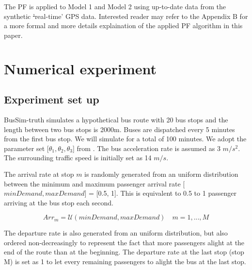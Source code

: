 \documentclass[11pt]{article}
\providecommand{\DIFaddtex}[1]{{\protect\color{blue}\uwave{#1}}} %
\providecommand{\DIFdeltex}[1]{{\protect\color{red}\sout{#1}}}                      %
\providecommand{\DIFaddbegin}{} %
\providecommand{\DIFaddend}{} %
\providecommand{\DIFdelbegin}{} %
\providecommand{\DIFdelend}{} %
\providecommand{\DIFadd}[1]{\texorpdfstring{\DIFaddtex{#1}}{#1}} %
\providecommand{\DIFdel}[1]{\texorpdfstring{\DIFdeltex{#1}}{}} %
\newcommand{\DIFscaledelfig}{0.5}
\newlength{\DIFdelgraphicswidth} %
\newlength{\DIFdelgraphicsheight} %
\newcommand{\DIFaddincludegraphics}[2][]{{\color{blue}\fbox{\DIFOincludegraphics[#1]{#2}}}} %
\newcommand{\DIFdelincludegraphics}[2][]{%
\sbox{\DIFdelgraphicsbox}{\DIFOincludegraphics[#1]{#2}}%
\settoboxwidth{\DIFdelgraphicswidth}{\DIFdelgraphicsbox} %
\settoboxtotalheight{\DIFdelgraphicsheight}{\DIFdelgraphicsbox} %
\scalebox{\DIFscaledelfig}{%
\parbox[b]{\DIFdelgraphicswidth}{\usebox{\DIFdelgraphicsbox}\\[-\baselineskip] \rule{\DIFdelgraphicswidth}{0em}}\llap{\resizebox{\DIFdelgraphicswidth}{\DIFdelgraphicsheight}{%
\setlength{\unitlength}{\DIFdelgraphicswidth}%
\begin{picture}(1,1)%
\thicklines\linethickness{2pt} %
{\color[rgb]{1,0,0}\put(0,0){\framebox(1,1){}}}%
{\color[rgb]{1,0,0}\put(0,0){\line( 1,1){1}}}%
{\color[rgb]{1,0,0}\put(0,1){\line(1,-1){1}}}%
\end{picture}%
}\hspace*{3pt}}} %
} %
\DeclareRobustCommand{\DIFaddbegin}{\DIFOaddbegin \let\includegraphics\DIFaddincludegraphics} %
\DeclareRobustCommand{\DIFaddend}{\DIFOaddend \let\includegraphics\DIFOincludegraphics} %
\DeclareRobustCommand{\DIFdelbegin}{\DIFOdelbegin \let\includegraphics\DIFdelincludegraphics} %
\DeclareRobustCommand{\DIFdelend}{\DIFOaddend \let\includegraphics\DIFOincludegraphics} %
\begin{document}
The PF is applied to Model 1 and Model 2 using up-to-date data from the synthetic \DIFdelbegin \DIFdel{'}\DIFdelend \DIFaddbegin \DIFadd{`}\DIFaddend real-time' GPS data. Interested reader may refer to the Appendix B for a more formal and more details explaination of the applied PF algorithm in this paper. \DIFaddbegin {}
\DIFaddend 



\section{Numerical experiment}
\label{s:experiments}
\subsection{Experiment set up}

BusSim-truth simulates a hypothetical bus route with 20 bus stops and the length between two bus stops is 2000m\DIFaddbegin {}\DIFaddend . Buses are dispatched every 5 minutes from the first bus stop. We will simulate for a total of 100 minutes. We adopt the parameter set [$\theta_1,\theta_2,\theta_3$] from \citet{bertini2004modeling}. The bus acceleration rate is assumed as 3 $m/s^2$. The surrounding traffic speed is initially set as 14 $m/s$\DIFaddbegin {}\DIFaddend .

The arrival rate at stop $m$ is randomly generated from an uniform distribution between the minimum and maximum passenger arrival rate [$minDemand, maxDemand$] = [0.5, 1]. This is equivalent to 0.5 to 1 passenger arriving at the bus stop each second.  
\DIFdelbegin %

\DIFdelend \begin{equation}
    Arr_m = \mathcal{U} (minDemand, maxDemand) \quad m = 1,...,M
    \label{eq:arrival_rate}
\end{equation}

The departure rate is also generated from an uniform distribution, but also ordered non-decreasingly to represent the fact that more passengers alight at the end of the route than at the beginning. The departure rate at the last stop (stop M) is set as 1 to let every remaining passengers to alight the bus at the last stop. 
\DIFdelbegin %
\end{document}
